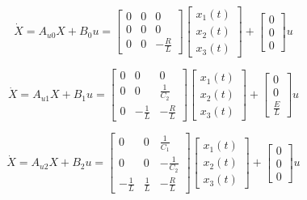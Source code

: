 \begin{equation}
	\dot{X}=A_{u0}X+B_{0}u=
	\left[
		\begin{array}{ccc}
			0&0&0 \\
			0&0&0 \\
			0&0&-\frac{R}{L} 
		\end{array}
	\right]
	\left[
		\begin{array}{c}
			x_1(t)\\
			x_2(t)\\
			x_3(t)
		\end{array}
	\right]
	+
	\left[
		\begin{array}{c}
			0\\
			0\\
			0
		\end{array}
	\right]
	u
\end{equation}

\begin{equation}
	\dot{X}=A_{u1}X+B_{1}u=
	\left[
		\begin{array}{ccc}
			0&0&0 \\
			0&0&\frac{1}{C_2} \\
			0&-\frac{1}{L}&-\frac{R}{L} 
		\end{array}
	\right]
	\left[
		\begin{array}{c}
			x_1(t)\\
			x_2(t)\\
			x_3(t)
		\end{array}
	\right]
	+
	\left[
		\begin{array}{c}
			0\\
			0\\
			\frac{E}{L}
		\end{array}
	\right]
	u
\end{equation}

\begin{equation}
	\dot{X}=A_{u2}X+B_{2}u=
	\left[
		\begin{array}{ccc}
			0&0&\frac{1}{C_1} \\
			0&0&-\frac{1}{C_2} \\
			-\frac{1}{L}&\frac{1}{L}&-\frac{R}{L} 
		\end{array}
	\right]
	\left[
		\begin{array}{c}
			x_1(t)\\
			x_2(t)\\
			x_3(t)
		\end{array}
	\right]
	+
	\left[
		\begin{array}{c}
			0\\
			0\\
			0
		\end{array}
	\right]
	u
\end{equation}

